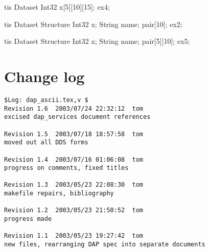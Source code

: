\documentclass[justify]{dods-paper}
\begin{document}
\begin{vcode}{tis}
Dataset {
    Int32 x[5][10][15];
} ex4;
\end{vcode}

\begin{vcode}{tis}
Dataset {
    Structure {
        Int32 x;
        String name;
    } pair[10];
} ex2;
\end{vcode}

\begin{vcode}{tis}
Dataset {
    Structure {
        Int32 x;
        String name;
    } pair[5][10];
} ex5;
\end{vcode}



\section{Change log}

\begin{verbatim}
$Log: dap_ascii.tex,v $
Revision 1.6  2003/07/24 22:32:12  tom
excised dap_services document references

Revision 1.5  2003/07/18 18:57:58  tom
moved out all DDS forms

Revision 1.4  2003/07/16 01:06:08  tom
progress on comments, fixed titles

Revision 1.3  2003/05/23 22:08:30  tom
makefile repairs, bibliography

Revision 1.2  2003/05/23 21:50:52  tom
progress made

Revision 1.1  2003/05/23 19:27:42  tom
new files, rearranging DAP spec into separate documents


\end{verbatim}
\end{document}
